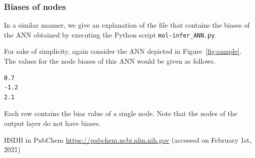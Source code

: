\documentclass[11pt, titlepage, dvipdfmx, twoside]{article}
\newcommand{\figref}[1]{Figure~\ref{fig:#1}}
\begin{document}
\subsubsection{Biases of nodes}
In a similar manner,
we give an explanation of the file that contains the
biases of the ANN obtained
by executing the Python script \verb|mol-infer_ANN.py|.

For sake of simplicity, again consider
the ANN depicted in \figref{sample}.
The values for the node biases of this ANN would be given as follows.
%
\begin{oframed}
{\small
\begin{verbatim}
0.7
-1.2
2.1
\end{verbatim}
}
\end{oframed}
Each row contains the bias value of a single node.
Note that the nodes of the output layer do not have biases.

\begin{thebibliography}{9}
 HSDB in 
PubChem \url{https://pubchem.ncbi.nlm.nih.gov} (accessed on February 1st, 2021)
\end{thebibliography}
\end{document}
